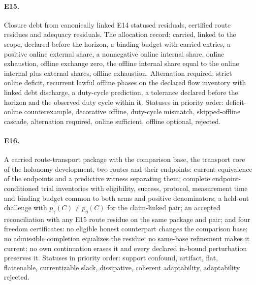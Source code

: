 \paragraph{E15.} Closure debt from canonically linked E14 statused residuals, certified route residues
and adequacy residuals. The allocation record: carried, linked to the scope, declared before the
horizon, a binding budget with carried entries, a positive online external share, a nonnegative online
internal share, online exhaustion, offline exchange zero, the offline internal share equal to the
online internal plus external shares, offline exhaustion. Alternation required: strict online deficit,
recurrent lawful offline phases on the declared flow inventory with linked debt discharge, a
duty-cycle prediction, a tolerance declared before the horizon and the observed duty cycle within it.
Statuses in priority order: deficit-online counterexample, decorative offline, duty-cycle mismatch,
skipped-offline cascade, alternation required, online sufficient, offline optional, rejected.

\paragraph{E16.} A carried route-transport package with the comparison base, the transport core of the
holonomy development, two routes and their endpoints; current equivalence of the endpoints and a
predictive witness separating them; complete endpoint-conditioned trial inventories with eligibility,
success, protocol, measurement time and binding budget common to both arms and positive denominators;
a held-out challenge with $p_\gamma(C) \ne p_\eta(C)$ for the claim-linked pair; an accepted
reconciliation with any E15 route residue on the same package and pair; and four freedom certificates:
no eligible honest counterpart changes the comparison base; no admissible completion equalizes the
residue; no same-base refinement makes it current; no own continuation erases it and every declared
in-bound perturbation preserves it. Statuses in priority order: support confound, artifact, flat,
flattenable, currentizable slack, dissipative, coherent adaptability, adaptability rejected.
